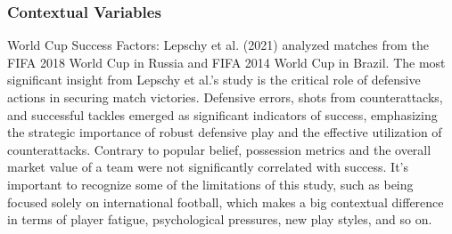 \subsubsection{Contextual Variables}
World Cup Success Factors: Lepschy et al. (2021) \cite{Lepschy2021} analyzed matches from the FIFA 2018 World Cup in Russia and FIFA 2014 World Cup in Brazil. The most significant insight from Lepschy et al.'s study is the critical role of defensive actions in securing match victories. Defensive errors, shots from counterattacks, and successful tackles emerged as significant indicators of success, emphasizing the strategic importance of robust defensive play and the effective utilization of counterattacks. Contrary to popular belief, possession metrics and the overall market value of a team were not significantly correlated with success. It's important to recognize some of the limitations of this study, such as being focused solely on international football, which makes a big contextual difference in terms of player fatigue, psychological pressures, new play styles, and so on.

